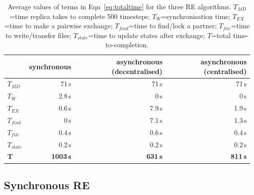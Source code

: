 \documentclass{rspublic}
\newcommand{\jhanote}[1]{ {\textcolor{red} { ***shantenu: #1 }}}
\newcommand{\athotanote}[1]{ {\textcolor{green} { ***athota: #1 }}}
\newcommand{\athotanote}[1]{}
\newcommand{\jhanote}[1]{}
\begin{document}

\begin{table}
    \centering
	\begin{tabular}{|l|r|r|r|}
	\hline
	                        &\textbf{synchronous}  &\textbf{asynchronous (decentralised)} 
	                        &\textbf{asynchronous (centralised)}\\
	\hline
	\hline
	$T_{MD}$       &71\,s &71\,s &71\,s\\
	\hline
	\hline
	$T_{W}$        &2.8\,s &0\,s &0\,s\\
	\hline\hline
	$T_{EX}$        &0.6\,s &7.9\,s &1.9\,s\\
	\hline
	\hspace{2mm}$T_{find}$        &0\,s   &7.1\,s &1.3\,s\\
	\hline
	\hspace{2mm}$T_{file}$       &0.4\,s &0.6\,s &0.4\,s\\
	\hline
    \hspace{2mm}$T_{state}$    &0.2\,s &0.2\,s  &0.2\,s\\
	\hline
	\hline
	$\mathbf{T}$        &\textbf{1003\,s} &\textbf{631\,s}    &\textbf{811\,s}\\
	\hline
    \end{tabular}
    \caption{Average values of terms in Eqn~\ref{eq:totaltime} for the three RE algorithms. $T_{MD}$=time replica takes to complete 500 timesteps; $T_W$=synchronisation time; $T_{EX}$=time to make a pairwise exchange; $T_{find}$=time to find/lock a partner; $T_{file}$=time to write/transfer files; $T_{state}$=time to update states after exchange; $T$=total time-to-completion.} 
	\label{table:repex_perf}
\end{table}

\subsection{Synchronous RE}
\end{document}

